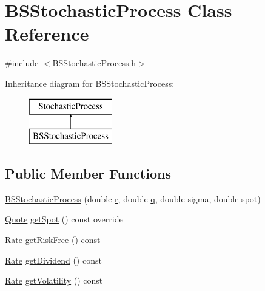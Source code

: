 \hypertarget{class_b_s_stochastic_process}{}\section{B\+S\+Stochastic\+Process Class Reference}
\label{class_b_s_stochastic_process}


{\ttfamily \#include $<$B\+S\+Stochastic\+Process.\+h$>$}

Inheritance diagram for B\+S\+Stochastic\+Process\+:\begin{figure}[H]
\begin{center}
\leavevmode
\includegraphics[height=2.000000cm]{class_b_s_stochastic_process}
\end{center}
\end{figure}
\subsection*{Public Member Functions}
\begin{DoxyCompactItemize}
\item 
\hyperlink{class_b_s_stochastic_process_aed9545004ecc3b8a23e95e6406f48327}{B\+S\+Stochastic\+Process} (double \hyperlink{_uniform_l_ecuyer_r_n_g1_8cpp_a372556d73d7e403d9b677b89b21ee572}{r}, double \hyperlink{_uniform_l_ecuyer_r_n_g1_8cpp_a5cf10165494588b84d4231e0e8a5b1a9}{q}, double sigma, double spot)
\item 
\hyperlink{_name_def_8h_a642a6c5fd87319d922637de0e0bb0305}{Quote} \hyperlink{class_b_s_stochastic_process_a604f867d372fc55a6dfae456f56604ea}{get\+Spot} () const override
\item 
\hyperlink{_name_def_8h_a25bee43a162de339c81f3d1caf6b887d}{Rate} \hyperlink{class_b_s_stochastic_process_a9cd46cb3dceb0aee302bf3a6c2ea39a1}{get\+Risk\+Free} () const
\item 
\hyperlink{_name_def_8h_a25bee43a162de339c81f3d1caf6b887d}{Rate} \hyperlink{class_b_s_stochastic_process_a42caffac3e61f92af6849b86df0d9b6b}{get\+Dividend} () const
\item 
\hyperlink{_name_def_8h_a25bee43a162de339c81f3d1caf6b887d}{Rate} \hyperlink{class_b_s_stochastic_process_ab63f363e94441ed0ee22ef10beea16a6}{get\+Volatility} () const
\end{DoxyCompactItemize}
